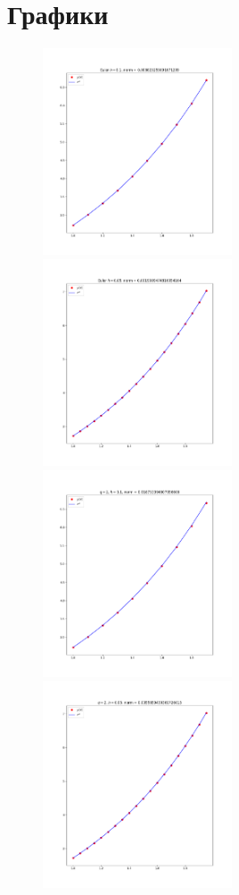 \documentclass{article}
\begin{document}
\section*{Графики}
\begin{figure}[H]
\includegraphics[width=0.5\textwidth]{Figure_1.png}
\includegraphics[width=0.5\textwidth]{Figure_2.png}
\includegraphics[width=0.5\textwidth]{Figure_3.png}
\includegraphics[width=0.5\textwidth]{Figure_4.png}

\end{figure}
\end{document}
